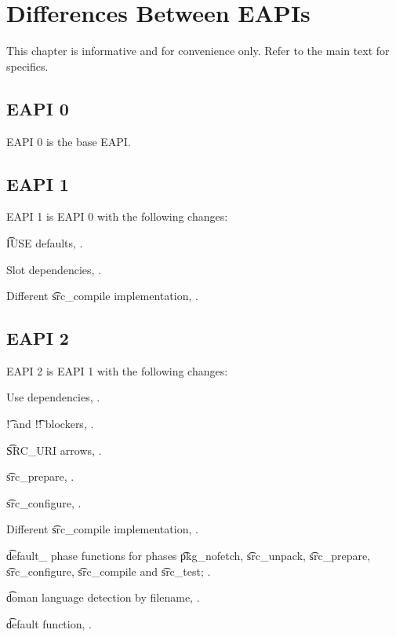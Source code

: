 \chapter{Differences Between EAPIs}

\note This chapter is informative and for convenience only. Refer to the main text for specifics.

\section*{EAPI 0}

EAPI 0 is the base EAPI.

\section*{EAPI 1}

EAPI 1 is EAPI 0 with the following changes:

\begin{compactitem}
\item \t{IUSE} defaults, .
\item Slot dependencies, .
\item Different \t{src\_compile} implementation, .
\end{compactitem}

\section*{EAPI 2}

EAPI 2 is EAPI 1 with the following changes:

\begin{compactitem}
\item Use dependencies, .
\item \t{!} and \t{!!} blockers, .
\item \t{SRC\_URI} arrows, .
\item \t{src\_prepare}, .
\item \t{src\_configure}, .
\item Different \t{src\_compile} implementation, .
\item \t{default\_} phase functions for phases \t{pkg\_nofetch}, \t{src\_unpack}, \t{src\_prepare},
    \t{src\_configure}, \t{src\_compile} and \t{src\_test}; .
\item \t{doman} language detection by filename, .
\item \t{default} function, .
\end{compactitem}

